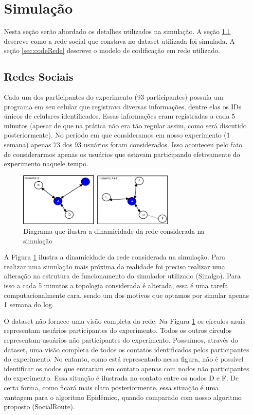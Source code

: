 \section{Simulação}
\label{simulacao}

Nesta seção serão abordado os detalhes utilizados na simulação. A seção
\ref{sec:redesSociais} 
descreve como a rede social que constava no dataset utilizada foi
simulada. A seção \ref{sec:codeRede} descreve o modelo de codificação em
rede utilizado.

\subsection{Redes Sociais} \label{sec:redesSociais}

Cada um dos participantes do experimento (93 participantes) possuía um
programa em seu celular que registrava diversas informações, dentre elas
os IDs únicos de celulares identificados. Essas informações eram
registradas a cada 5 minutos (apesar de que na prática não era tão
regular assim, como será discutido posteriormente). No período em que
consideramos em nosso experimento (1 semana) apenas 73 dos 93 usuários
foram considerados. Isso aconteceu pelo fato de considerarmos apenas os
usuários que estavam participando efetivamente do experimento naquele
tempo.

\begin{figure}[ht]
\centering
\includegraphics[width=0.7\textwidth]{img/diagramas/redeSocial.png}
\caption{Diagrama que ilustra a dinamicidade da rede considerada na
simulação}
\label{fig:diagramaRedeSocial}
\end{figure}


A Figura \ref{fig:diagramaRedeSocial} ilustra a dinamicidade da rede
considerada na simulação. Para realizar uma simulação mais próxima da
realidade foi preciso realizar uma alteração na estrutura de
funcionamento do simulador utilizado (Sinalgo). Para isso a cada 5
minutos a topologia considerada é alterada, essa é uma tarefa
computacionalmente cara, sendo um dos motivos que optamos por simular
apenas 1 semana do log. 

O dataset não fornece uma visão completa da rede. Na Figura
\ref{fig:diagramaRedeSocial} os círculos azuis representam usuários
participantes do experimento. Todos os outros círculos representam
usuários não participantes do experimento. Possuímos, através do
dataset, uma visão completa de todos os contatos identificados pelos
participantes do experimento. No entanto, como está representado nessa
figura, não é possível identificar os nodos que entraram em contato
apenas com nodos não participantes do experimento. Essa situação é
ilustrada no contato entre os nodos D e F. De certa forma, como ficará
mais claro posteriormente, essa situação é uma vantagem para o algoritmo
Epidêmico, quando comparado com nosso algoritmo proposto (SocialRoute).


